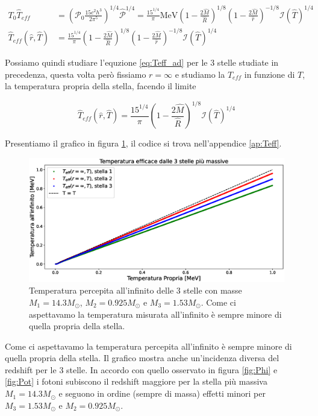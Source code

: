 \documentclass[a4paper, titlepage]{article}
\begin{document}
\begin{align}
    T_0 \hat T_{eff} &= \left( \mathcal P_0 \frac{15 c^2 h^3}{2 \pi^5} \right)^{1/4} \mathcal{\hat P}^{1/4}
    = \frac{15^{1/4}}{\pi} \unit{\mega\electronvolt} \left(1 - \frac{2 \hat M}{\hat R} \right)^{1/8} \left(1 - \frac{2 \hat M}{\hat r} \right)^{-1/8} \mathcal{I} (\hat T)^{1/4} \\
    \hat T_{eff}(\hat r, \hat T) &= \frac{15^{1/4}}{\pi} \left(1 - \frac{2 \hat M}{\hat R} \right)^{1/8} \left(1 - \frac{2 \hat M}{\hat r} \right)^{-1/8} \mathcal{I} (\hat T)^{1/4}
    \label{eq:Teff_ad}
\end{align}

Possiamo quindi studiare l'equzione \ref{eq:Teff_ad} per le 3 stelle studiate in precedenza, questa volta però fissiamo $r = \infty$ e studiamo la $T_{eff}$ in funzione di $T$, la temperatura propria della stella, facendo il limite

\begin{equation}
    \hat T_{eff}(\hat r, \hat T) = \frac{15^{1/4}}{\pi} \left(1 - \frac{2 \hat M}{\hat R} \right)^{1/8} \mathcal{I} (\hat T)^{1/4}
\end{equation}

Presentiamo il grafico in figura \ref{fig:Teff}, il codice si trova nell'appendice \ref{ap:Teff}.

\begin{figure}[h]
    \centering
    \includegraphics[width = \textwidth]{Figures/Teff.eps}
    \caption{Temperatura percepita all'infinito delle 3 stelle con masse $M_1 = 14.3 M_\odot$, $M_2 = 0.925 M_\odot$ e $M_3 = 1.53 M_\odot$. Come ci aspettavamo la temperatura misurata all'infinito è sempre minore di quella propria della stella.}
    \label{fig:Teff}
\end{figure}

Come ci aspettavamo la temperatura percepita all'infinito è sempre minore di quella propria della stella.
Il grafico mostra anche un'incidenza diversa del redshift per le 3 stelle.
In accordo con quello osservato in figura \ref{fig:Phi} e \ref{fig:Pot} i fotoni subiscono il redshift maggiore per la stella più massiva $M_1 = 14.3 M_\odot$ e seguono in ordine (sempre di massa) effetti minori per $M_3 = 1.53 M_\odot$ e $M_2 = 0.925 M_\odot$.
\end{document}

